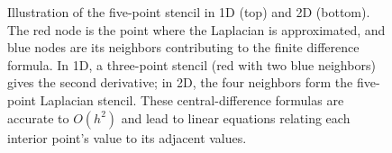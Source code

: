 \documentclass[a4paper,11pt]{article}
\begin{document}
\begin{enumerate}
\begin{figure}[H]
              \caption{Illustration of the five-point stencil in 1D (top) and 2D (bottom). The red node is the point where the Laplacian is approximated, and blue nodes are its neighbors contributing to the finite difference formula. In 1D, a three-point stencil (red with two blue neighbors) gives the second derivative; in 2D, the four neighbors form the five-point Laplacian stencil. These central-difference formulas are accurate to $O(h^2)$ and lead to linear equations relating each interior point's value to its adjacent values.}
          \end{figure}


\end{enumerate}
\end{document}
